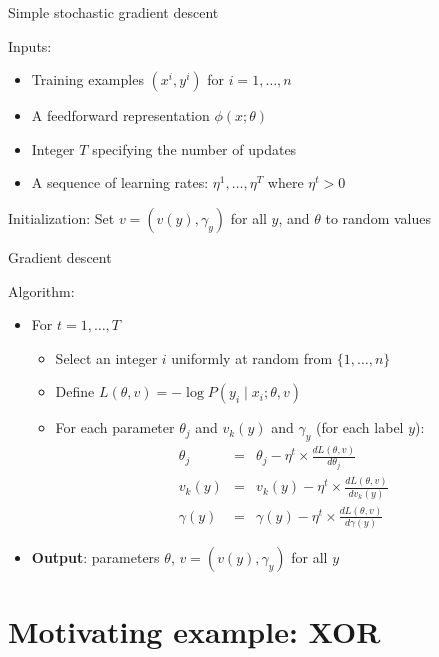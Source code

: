 \begin{frame}{Simple stochastic gradient descent}
\begin{block}{Inputs:}
\begin{itemize}[<+->]
\item Training examples $(x^i, y^i)$ for $i = 1, \ldots, n$
\item A feedforward representation $\phi(x; \theta)$
\item Integer $T$ specifying the number of updates
\item A sequence of learning rates: $\eta^1, \ldots, \eta^T$ where $\eta^t > 0$
\end{itemize}
\end{block}
\pause
\begin{block}{Initialization:}
Set $v = (v(y), \gamma_y)$ for all $y$, and $\theta$ to random values
\end{block}
\end{frame}

\begin{frame}{Gradient descent}
\begin{block}{Algorithm:}
\begin{itemize}[<+->]
\item For $t = 1, \ldots, T$
\begin{itemize}[<+->]
\item Select an integer $i$ uniformly at random from $\{ 1, \ldots, n \}$
\item Define $L(\theta, v) = - \log P(y_i \mid x_i; \theta, v)$
\item For each parameter $\theta_j$ and $v_k(y)$ and $\gamma_y$ (for each label $y$):
\begin{eqnarray*}
\theta_j &=& \theta_j - \eta^t \times \frac{dL(\theta,v)}{d\theta_j} \\
v_k(y) &=& v_k(y) - \eta^t \times \frac{dL(\theta,v)}{d v_k(y)} \\
\gamma(y) &=& \gamma(y) - \eta^t \times \frac{dL(\theta,v)}{d \gamma(y)}
\end{eqnarray*}
\end{itemize}
\item \textbf{Output}: parameters $\theta$, $v = (v(y), \gamma_y)$ for all $y$
\end{itemize}
\end{block}
\end{frame}

\section{Motivating example: XOR}
\frame{\tableofcontents[currentsection]}

